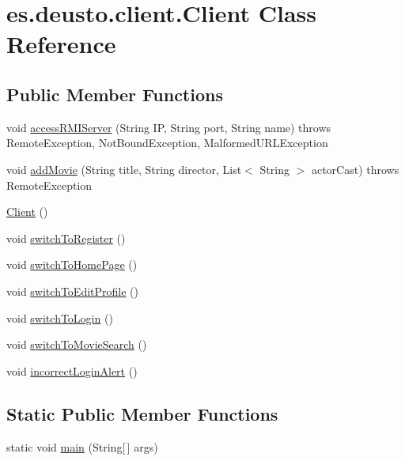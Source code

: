 \hypertarget{classes_1_1deusto_1_1client_1_1_client}{}\section{es.\+deusto.\+client.\+Client Class Reference}
\label{classes_1_1deusto_1_1client_1_1_client}
\subsection*{Public Member Functions}
\begin{DoxyCompactItemize}
\item 
void \mbox{\hyperlink{classes_1_1deusto_1_1client_1_1_client_aaed61e092ef0cfa2b78065df6e6b0f55}{access\+R\+M\+I\+Server}} (String IP, String port, String name)  throws Remote\+Exception, Not\+Bound\+Exception, Malformed\+U\+R\+L\+Exception 
\item 
void \mbox{\hyperlink{classes_1_1deusto_1_1client_1_1_client_ab3ebcc9daf4719fe0c9354a49d5957e4}{add\+Movie}} (String title, String director, List$<$ String $>$ actor\+Cast)  throws Remote\+Exception 
\item 
\mbox{\hyperlink{classes_1_1deusto_1_1client_1_1_client_a71c03e318a72447da873297f3364f67f}{Client}} ()
\item 
void \mbox{\hyperlink{classes_1_1deusto_1_1client_1_1_client_a8b292db7d6ec16eaa53b224bb7a33ab4}{switch\+To\+Register}} ()
\item 
void \mbox{\hyperlink{classes_1_1deusto_1_1client_1_1_client_aff17deef622ce410b473d4dadad36343}{switch\+To\+Home\+Page}} ()
\item 
void \mbox{\hyperlink{classes_1_1deusto_1_1client_1_1_client_afefdad03c88bee0a0427af249604cf19}{switch\+To\+Edit\+Profile}} ()
\item 
void \mbox{\hyperlink{classes_1_1deusto_1_1client_1_1_client_a66fff847d9f168900f6992fd4eff5e3d}{switch\+To\+Login}} ()
\item 
void \mbox{\hyperlink{classes_1_1deusto_1_1client_1_1_client_a7cf818fce703324d74c896d9e4149dbe}{switch\+To\+Movie\+Search}} ()
\item 
void \mbox{\hyperlink{classes_1_1deusto_1_1client_1_1_client_a8bbc4a71a4aaff50bfe419a724898790}{incorrect\+Login\+Alert}} ()
\end{DoxyCompactItemize}
\subsection*{Static Public Member Functions}
\begin{DoxyCompactItemize}
\item 
static void \mbox{\hyperlink{classes_1_1deusto_1_1client_1_1_client_a69a7526d0af9cb2341f4bf341b501152}{main}} (String\mbox{[}$\,$\mbox{]} args)
\end{DoxyCompactItemize}


